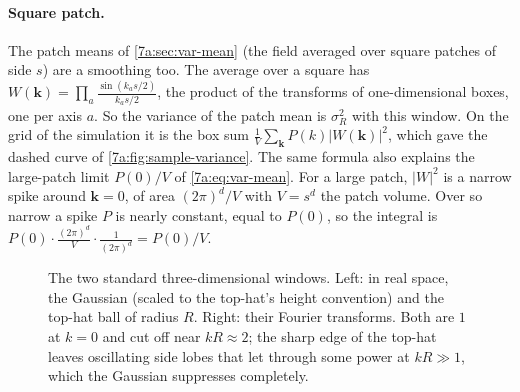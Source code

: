 \paragraph{Square patch.}
The patch means of \cref{7a:sec:var-mean} (the field averaged over square
patches of side $s$) are a smoothing too. The average over a square has
$W(\bm k)=\prod_a\frac{\sin(k_as/2)}{k_as/2}$, the product of the transforms of
one-dimensional boxes, one per axis $a$. So the variance of the patch mean is
$\sigma_R^2$ with this window. On the grid of the simulation it is the box sum
$\frac1V\sum_{\bm k}P(k)|W(\bm k)|^2$, which gave the dashed curve of
\cref{7a:fig:sample-variance}. The same formula also explains the large-patch
limit $P(0)/V$ of \eqref{7a:eq:var-mean}. For a large patch, $|W|^2$ is a narrow
spike around $\bm k=0$, of area $(2\pi)^d/V$ with $V=s^d$ the patch volume. Over
so narrow a spike $P$ is nearly constant, equal to $P(0)$, so the integral is
$P(0)\cdot\frac{(2\pi)^d}{V}\cdot\frac{1}{(2\pi)^d}=P(0)/V$.

\begin{figure}[htbp]
\centering
{}
\caption{The two standard three-dimensional windows. Left: in real space, the
Gaussian (scaled to the top-hat's height convention) and the top-hat ball of
radius $R$. Right: their Fourier transforms. Both are $1$ at $k=0$ and cut off near
$kR\approx2$; the sharp edge of the top-hat leaves oscillating side lobes that let
through some power at $kR\gg1$, which the Gaussian suppresses completely.}
\label{7a:fig:windows}
\end{figure}

